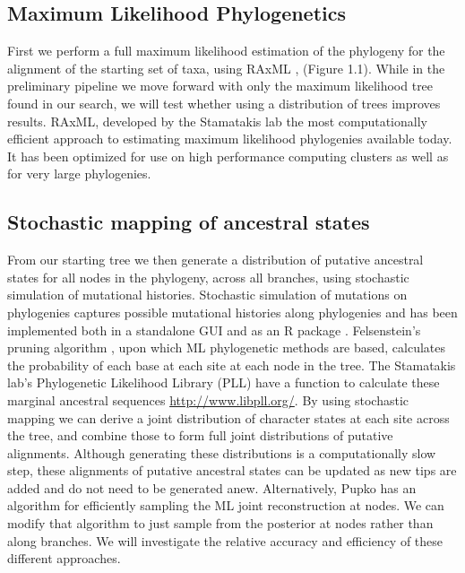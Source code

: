 \documentclass[10pt]{article}
\begin{document}
\subsection*{Maximum Likelihood Phylogenetics}
First we perform a full maximum likelihood estimation of the phylogeny for the alignment of the starting set of taxa, using RAxML \cite{stamatakis_RAxML_2014}, (Figure 1.1). 
While in the preliminary pipeline we move forward with only the maximum likelihood tree found in our search, we will test whether using a distribution of trees improves results. 
RAxML, developed by the Stamatakis lab the most computationally efficient approach to estimating maximum likelihood phylogenies available today. 
It has been optimized for use on high performance computing clusters \cite{stamatakis_raxml-vi-hpc:_2006} as well as for very large phylogenies\cite{stamatakis_RAxML-Light:_2012}.

\subsection*{Stochastic mapping of ancestral states}
From our starting tree we then generate a distribution of putative ancestral states for all nodes in the phylogeny, across all branches, using stochastic simulation of mutational histories. 
Stochastic simulation of mutations on phylogenies captures possible mutational histories along phylogenies \cite{nielsen_mapping_2002}\cite{huelsenbeck_stochastic_2003} and has been implemented both in a standalone GUI \cite{bollback_simmap:_2006} and as an R package \cite{revell_phytools:_2012}. 
Felsenstein's pruning algorithm \cite{felsenstein_evolutionary_1981}, upon which ML phylogenetic methods are based, calculates the probability of each base at each site at each node in the tree. 
The Stamatakis lab's Phylogenetic Likelihood Library (PLL) have a function to calculate these marginal ancestral sequences \url{http://www.libpll.org/}.
By using stochastic mapping we can derive a joint distribution of character states at each site across the tree, and combine those to form full joint distributions of putative alignments. 
Although generating these distributions is a computationally slow step, these alignments of putative ancestral states can be updated as new tips are added and do not need to be generated anew. 
Alternatively, Pupko\cite{pupko_fast_2000} \cite{Ashkenazy_FastML:_2012} has an algorithm for efficiently sampling the ML joint reconstruction at nodes. 
We can modify that algorithm to just sample from the posterior at nodes rather than along branches.
We will investigate the relative accuracy and efficiency of these different approaches.
\end{document}
